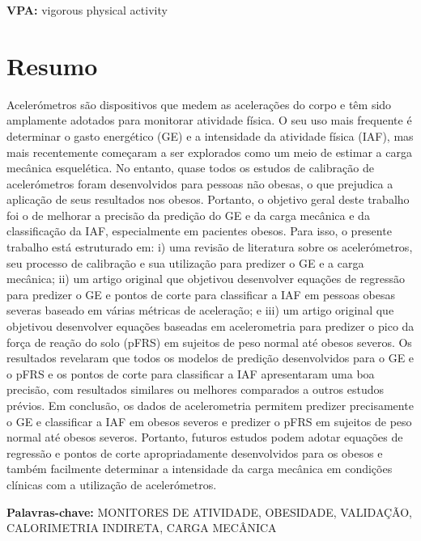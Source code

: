 \documentclass[12pt]{article}
\begin{document}
\noindent \textbf{VPA:} vigorous physical activity

\pagebreak

\section*{\hfil Resumo \hfil}
\vspace{0.5em}

\noindent Acelerómetros são dispositivos que medem as acelerações do corpo e têm sido amplamente adotados para monitorar atividade física. O seu uso mais frequente é determinar o gasto energético (GE) e a intensidade da atividade física (IAF), mas mais recentemente começaram a ser explorados como um meio de estimar a carga mecânica esquelética. No entanto, quase todos os estudos de calibração de acelerómetros foram desenvolvidos para pessoas não obesas, o que prejudica a aplicação de seus resultados nos obesos. Portanto, o objetivo geral deste trabalho foi o de melhorar a precisão da predição do GE e da carga mecânica e da classificação da IAF, especialmente em pacientes obesos. Para isso, o presente trabalho está estruturado em: i) uma revisão de literatura sobre os acelerómetros, seu processo de calibração e sua utilização para predizer o GE e a carga mecânica; ii) um artigo original que objetivou desenvolver equações de regressão para predizer o GE e pontos de corte para classificar a IAF em pessoas obesas severas baseado em várias métricas de aceleração; e iii) um artigo original que objetivou desenvolver equações baseadas em acelerometria para predizer o pico da força de reação do solo (pFRS) em sujeitos de peso normal até obesos severos. Os resultados revelaram que todos os modelos de predição desenvolvidos para o GE e o pFRS e os pontos de corte para classificar a IAF apresentaram uma boa precisão, com resultados similares ou melhores comparados a outros estudos prévios. Em conclusão, os dados de acelerometria permitem predizer precisamente o GE e classificar a IAF em obesos severos e predizer o pFRS em sujeitos de peso normal até obesos severos. Portanto, futuros estudos podem adotar equações de regressão e pontos de corte apropriadamente desenvolvidos para os obesos e também facilmente determinar a intensidade da carga mecânica em condições clínicas com a utilização de acelerómetros.

\vspace{\fill}
\noindent
\textbf{Palavras-chave:} MONITORES DE ATIVIDADE, OBESIDADE, VALIDAÇÃO, CALORIMETRIA INDIRETA, CARGA MECÂNICA
\end{document}
